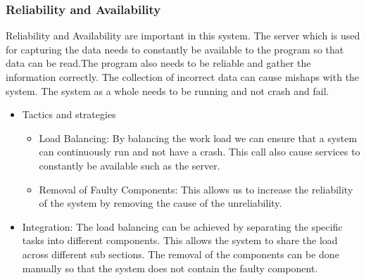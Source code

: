 \subsubsection{Reliability and Availability}	
\begin{flushleft}
Reliability and Availability are important in this system. The server which is used for capturing the data needs to constantly be available to the program so that data can be read.The program also needs to be reliable and gather the information correctly. The collection of incorrect data can cause mishaps with the system. The system as a whole needs to be running and not crash and fail.
\begin{itemize}
\item{Tactics and strategies}
\begin{itemize}
\item{Load Balancing}: By balancing the work load we can ensure that a system can continuously run and not have a crash. This call also cause services to constantly be available such as the server.
\item{Removal of Faulty Components}: This allows us to increase the reliability of the system by removing the cause of the unreliability.
\end{itemize}

\item{Integration}:
The load balancing can be achieved by separating the specific tasks into different components. This allows the system to share the load across different sub sections. The removal of the components can be done manually so that the system does not contain the faulty component.
\end{itemize}

\end{flushleft}	
		\iffalse
